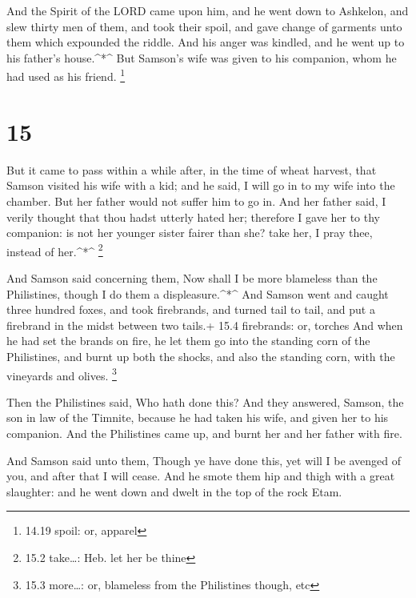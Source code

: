  And the Spirit of the LORD came upon him, and he went down
to Ashkelon, and slew thirty men of them, and took their spoil, and gave
change of garments unto them which expounded the riddle. And his anger
was kindled, and he went up to his father's house.\^{}*\^{}
 But Samson's wife was given to his companion, whom he had
used as his friend. \footnote{14.19 spoil: or, apparel}

\hypertarget{section-14}{%
\section{15}\label{section-14}}

 But it came to pass within a while after, in the time of
wheat harvest, that Samson visited his wife with a kid; and he said, I
will go in to my wife into the chamber. But her father would not suffer
him to go in.  And her father said, I verily thought that
thou hadst utterly hated her; therefore I gave her to thy companion: is
not her younger sister fairer than she? take her, I pray thee, instead
of her.\^{}*\^{} \footnote{15.2 take\ldots: Heb. let her be thine}

 And Samson said concerning them, Now shall I be more
blameless than the Philistines, though I do them a displeasure.\^{}*\^{}
 And Samson went and caught three hundred foxes, and took
firebrands, and turned tail to tail, and put a firebrand in the midst
between two tails.+ 15.4 firebrands: or, torches  And when
he had set the brands on fire, he let them go into the standing corn of
the Philistines, and burnt up both the shocks, and also the standing
corn, with the vineyards and olives. \footnote{15.3 more\ldots: or,
  blameless from the Philistines though, etc}

 Then the Philistines said, Who hath done this? And they
answered, Samson, the son in law of the Timnite, because he had taken
his wife, and given her to his companion. And the Philistines came up,
and burnt her and her father with fire.

 And Samson said unto them, Though ye have done this, yet
will I be avenged of you, and after that I will cease.  And
he smote them hip and thigh with a great slaughter: and he went down and
dwelt in the top of the rock Etam.

